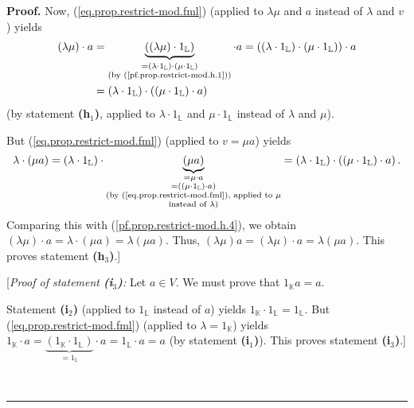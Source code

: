 \documentclass[numbers=enddot,12pt,final,onecolumn,notitlepage]{scrartcl}%
\theoremstyle{definition}
\newenvironment{fineprint}{\begin{small}}{\end{small}}
\newenvironment{proof}[1][Proof]{\noindent\textbf{#1.} }{\ \rule{0.5em}{0.5em}}
\begin{document}
\begin{fineprint}
\begin{proof}
Now, (\ref{eq.prop.restrict-mod.fml}) (applied to $\lambda\mu$ and $a$ instead
of $\lambda$ and $v$) yields
\begin{align}
\left(  \lambda\mu\right)  \cdot a  &  =\underbrace{\left(  \left(  \lambda
\mu\right)  \cdot1_{\mathbb{L}}\right)  }_{\substack{=\left(  \lambda
\cdot1_{\mathbb{L}}\right)  \cdot\left(  \mu\cdot1_{\mathbb{L}}\right)
\\\text{(by (\ref{pf.prop.restrict-mod.h.1}))}}}\cdot a=\left(  \left(
\lambda\cdot1_{\mathbb{L}}\right)  \cdot\left(  \mu\cdot1_{\mathbb{L}}\right)
\right)  \cdot a\nonumber\\
&  =\left(  \lambda\cdot1_{\mathbb{L}}\right)  \cdot\left(  \left(  \mu
\cdot1_{\mathbb{L}}\right)  \cdot a\right)  \label{pf.prop.restrict-mod.h.4}%
\end{align}
(by statement \textbf{(h}$_{1}$\textbf{)}, applied to $\lambda\cdot
1_{\mathbb{L}}$ and $\mu\cdot1_{\mathbb{L}}$ instead of $\lambda$ and $\mu$).

But (\ref{eq.prop.restrict-mod.fml}) (applied to $v=\mu a$) yields%
\[
\lambda\cdot\left(  \mu a\right)  =\left(  \lambda\cdot1_{\mathbb{L}}\right)
\cdot\underbrace{\left(  \mu a\right)  }_{\substack{=\mu\cdot a\\=\left(
\left(  \mu\cdot1_{\mathbb{L}}\right)  \cdot a\right)  \\\text{(by
(\ref{eq.prop.restrict-mod.fml}), applied to }\mu\\\text{instead of }%
\lambda\text{)}}}=\left(  \lambda\cdot1_{\mathbb{L}}\right)  \cdot\left(
\left(  \mu\cdot1_{\mathbb{L}}\right)  \cdot a\right)  .
\]
Comparing this with (\ref{pf.prop.restrict-mod.h.4}), we obtain $\left(
\lambda\mu\right)  \cdot a=\lambda\cdot\left(  \mu a\right)  =\lambda\left(
\mu a\right)  $. Thus, $\left(  \lambda\mu\right)  a=\left(  \lambda
\mu\right)  \cdot a=\lambda\left(  \mu a\right)  $. This proves statement
\textbf{(h}$_{3}$\textbf{)}.]

[\textit{Proof of statement \textbf{(i}}$_{3}$\textit{\textbf{)}:} Let $a\in
V$. We must prove that $1_{\mathbb{K}}a=a$.

Statement \textbf{(i}$_{2}$\textbf{)} (applied to $1_{\mathbb{L}}$ instead of
$a$) yields $1_{\mathbb{K}}\cdot1_{\mathbb{L}}=1_{\mathbb{L}}$. But
(\ref{eq.prop.restrict-mod.fml}) (applied to $\lambda=1_{\mathbb{K}}$) yields
$1_{\mathbb{K}}\cdot a=\underbrace{\left(  1_{\mathbb{K}}\cdot1_{\mathbb{L}%
}\right)  }_{=1_{\mathbb{L}}}\cdot a=1_{\mathbb{L}}\cdot a=a$ (by statement
\textbf{(i}$_{1}$\textbf{)}). This proves statement \textbf{(i}$_{3}%
$\textbf{)}.]


\end{proof}
\end{fineprint}
\end{document}
